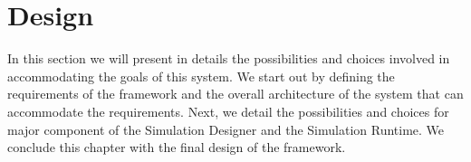 \chapter{Design}\label{ch:design}
In this section we will present in details the possibilities and choices involved in accommodating the goals of this system. We start out by defining the requirements of the framework and the overall architecture of the system that can accommodate the requirements. Next, we detail the possibilities and choices for major component of the Simulation Designer and the Simulation Runtime. We conclude this chapter with the final design of the framework.












